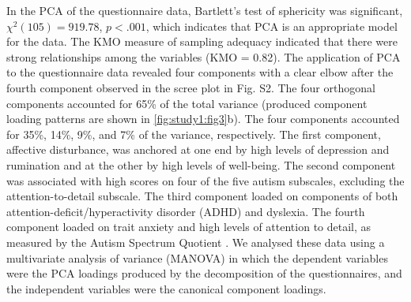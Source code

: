 In the PCA of the questionnaire data, Bartlett's test of sphericity was significant,
\(\chi^{2}(105) = 919.78\),
\(\mathit{p} < .001\),
which indicates that PCA is an appropriate model for the data. The KMO measure of sampling adequacy indicated that there were strong relationships among the variables (KMO = 0.82). The application of PCA to the questionnaire data revealed four components with a clear elbow after the fourth component observed in the scree plot in Fig. S2. The four orthogonal components accounted for 65\% of the total variance (produced component loading patterns are shown in \cref{fig:study1:fig3}b). The four components accounted for 35\%, 14\%, 9\%, and 7\% of the variance, respectively. The first component, affective disturbance, was anchored at one end by high levels of depression and rumination and at the other by high levels of well-being. The second component was associated with high scores on four of the five autism subscales, excluding the attention-to-detail subscale. The third component loaded on components of both attention-deficit/hyperactivity disorder (ADHD) and dyslexia. The fourth component loaded on trait anxiety and high levels of attention to detail, as measured by the Autism Spectrum Quotient \cite{Baron-Cohen2001}. We analysed these data using a multivariate analysis of variance (MANOVA) in which the dependent variables were the PCA loadings produced by the decomposition of the questionnaires, and the independent variables were the canonical component loadings.
